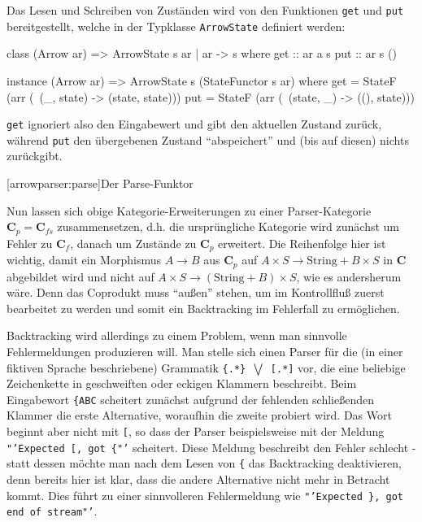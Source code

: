 \documentclass[11pt, a4paper, bibgerm]{book}
\newcommand\icode[1]{\lstinline?#1?}
\newcommand\lsection{}
\newcommand\ato{\rightarrow} %
\begin{document}
Das Lesen und Schreiben von Zuständen wird von den Funktionen \icode{get} und
\icode{put} bereitgestellt, welche in der Typklasse \icode{ArrowState}
definiert werden:

\begin{code}
class (Arrow ar) => ArrowState s ar | ar -> s where
  get :: ar a s
  put :: ar s ()

instance (Arrow ar) => ArrowState s (StateFunctor s ar)
  where
    get = StateF (arr (\ (_, state) -> (state, state)))
    put = StateF (arr (\ (state, _) -> ((), state)))
\end{code}

\icode{get} ignoriert also den Eingabewert und gibt den aktuellen
Zustand zurück, während \icode{put} den übergebenen Zustand
"`abspeichert"' und (bis auf diesen) nichts zurückgibt.

\lsection[arrowparser:parse]{Der Parse-Funktor}

Nun lassen sich obige Kategorie-Erweiterungen zu einer Parser-Kategorie
$\mathbf{C}_p = \mathbf{C}_{fs}$ zusammensetzen, d.h. die ursprüngliche
Kategorie wird zunächst um Fehler zu $\mathbf{C}_f$, danach um Zustände
zu $\mathbf{C}_p$ erweitert. Die Reihenfolge hier ist wichtig, damit ein
Morphismus $A \ato B$ aus $\mathbf{C}_p$ auf $A \times S \ato
\mathrm{String} + B \times S$ in $\mathbf{C}$ abgebildet wird und nicht
auf $A \times S \ato (\mathrm{String} + B) \times S$, wie es andersherum
wäre. Denn das Coprodukt muss "`außen"' stehen, um im Kontrollfluß
zuerst bearbeitet zu werden und somit ein Backtracking im Fehlerfall zu
ermöglichen.

Backtracking wird allerdings zu einem Problem, wenn man sinnvolle
Fehlermeldungen produzieren will. Man stelle sich einen Parser für die
(in einer fiktiven Sprache beschriebene) Grammatik \texttt{\{.*\}
  $\bigvee$ [.*]} vor, die eine beliebige Zeichenkette in geschweiften
oder eckigen Klammern beschreibt. Beim Eingabewort \texttt{\{ABC}
scheitert zunächst aufgrund der fehlenden schließenden Klammer die erste
Alternative, woraufhin die zweite probiert wird. Das Wort beginnt aber
nicht mit \texttt{[}, so dass der Parser beispielsweise mit der Meldung
\texttt{"'Expected [, got \{"'} scheitert. Diese Meldung beschreibt den
Fehler schlecht - statt dessen möchte man nach dem Lesen von \texttt{\{}
das Backtracking deaktivieren, denn bereits hier ist klar, dass die
andere Alternative nicht mehr in Betracht kommt. Dies führt zu einer
sinnvolleren Fehlermeldung wie \texttt{"'Expected \}, got end of
  stream"'}.
\end{document}
